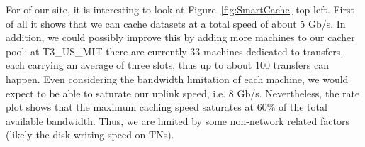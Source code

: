 For of our site, it is interesting to look at Figure~\ref{fig:SmartCache} top-left. First of all it 
shows that we can cache datasets at a total speed of about 5 Gb/s. In addition, we could possibly improve this by
adding more machines to our cacher pool:
at T3\_US\_MIT there are currently 33 machines dedicated to transfers, each carrying an average of three slots, 
thus up to about 100 transfers can happen. Even considering the bandwidth limitation of each machine, we would expect
to be able to saturate our uplink speed, i.e. 8 Gb/s. Nevertheless, the
rate plot shows that the maximum caching speed saturates at 60\% of the total available bandwidth.
Thus, we are limited by some non-network related factors (likely the disk writing speed on TNs).
